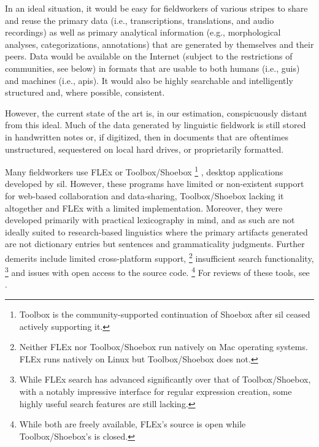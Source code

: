 \documentclass[11pt]{article}
\begin{document}
In an ideal situation, it would be easy for fieldworkers of various stripes to
share and reuse the primary data (i.e., transcriptions, translations, and audio
recordings) as well as primary analytical information (e.g., morphological
analyses, categorizations, annotations) that are generated by themselves and
their peers. Data would be available on the Internet (subject to the
restrictions of communities, see below) in formats that are usable to both
humans (i.e., \glspl{gui}) and machines (i.e., \glspl{api}). It would also be
highly searchable and intelligently structured and, where possible, consistent.

However, the current state of the art is, in our estimation, conspicuously
distant from this ideal. Much of the data generated by linguistic fieldwork is
still stored in handwritten notes or, if digitized, then in documents that are
oftentimes unstructured, sequestered on local hard drives, or proprietarily
formatted.


Many fieldworkers use FLEx \cite{sil-flex} or Toolbox/Shoebox%
\footnote{Toolbox is the community-supported continuation of Shoebox after
    \gls{sil} ceased actively supporting it.} %
\cite{sil-toolbox-info}, desktop applications developed by \gls{sil}. However,
these programs have limited or non-existent support for web-based collaboration
and data-sharing, Toolbox/Shoebox lacking it altogether and FLEx with a limited
implementation.  Moreover, they were developed primarily with practical
lexicography in mind, and as such are not ideally suited to research-based
linguistics where the primary artifacts generated are not dictionary entries
but sentences and grammaticality judgments. Further demerits include limited
cross-platform support,%
\footnote{Neither FLEx nor Toolbox/Shoebox run natively on Mac operating
    systems. FLEx runs natively on Linux but Toolbox/Shoebox does not.} %
insufficient search functionality,%
\footnote{While FLEx search has advanced significantly over that of
    Toolbox/Shoebox, with a notably impressive interface for regular expression
    creation, some highly useful search features are still lacking.} %
and issues with open access to the source code.%
\footnote{While both are freely available, FLEx's source is open while
Toolbox/Shoebox's is closed.} %
For reviews of these tools, see \cite{Butler:2007,rogers10,robinson07}.
\end{document}
